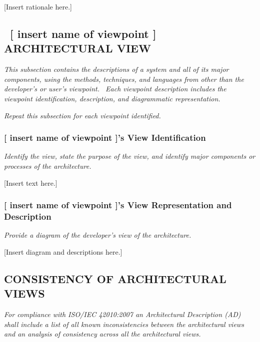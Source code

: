 \documentclass[twoside,letterpaper]{article}
\begin{document}
{\color{black}
[Insert rationale here.]}

\subsection[\ [ insert name of viewpoint {]} ARCHITECTURAL
VIEW]{\foreignlanguage{english}{\ }\foreignlanguage{english}{[ insert
name of viewpoint ] ARCHITECTURAL VIEW}}
{\itshape\color{black}
This subsection contains the descriptions of a system and all of its
major components, using the methods, techniques, and languages from
other than the developer{\textquoteright}s or user{\textquoteright}s
viewpoint. \ Each viewpoint description includes the viewpoint
identification, description, and diagrammatic representation. }


\bigskip

{\itshape\color{black}
Repeat this subsection for each viewpoint identified.}

\subsubsection{[ insert name of viewpoint ]{\textquoteright}s View
Identification}
{\itshape\color{black}
Identify the view, state the purpose of the view, and identify major
components or processes of the architecture.}

{\color{black}
[Insert text here.]}

\subsubsection{[ insert name of viewpoint ]{\textquoteright}s View
Representation and Description }
{\itshape\color{black}
Provide a diagram of the developer{\textquoteright}s view of the
architecture.}

{\color{black}
[Insert diagram and descriptions here.]}

\subsection[CONSISTENCY OF ARCHITECTURAL
VIEWS]{\bfseries\color{black} CONSISTENCY OF
ARCHITECTURAL VIEWS}
{\itshape\color{black}
For compliance with ISO/IEC 42010:2007 an Architectural
Description (AD) shall include a list of all known inconsistencies
between the architectural views and an analysis of consistency across
all the architectural views.}
\end{document}
